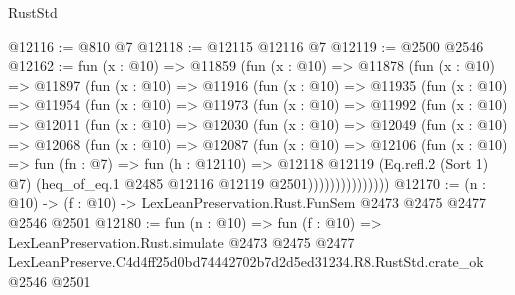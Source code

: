 \begin{lexlean}{RustStd}
\begin{coremodule}
@12116 := @810 @7
@12118 := @12115 @12116 @7
@12119 := @2500 @2546
@12162 := fun (x : @10) =>
  @11859
    (fun (x : @10) =>
    @11878
      (fun (x : @10) =>
      @11897
        (fun (x : @10) =>
        @11916
          (fun (x : @10) =>
          @11935
            (fun (x : @10) =>
            @11954
              (fun (x : @10) =>
              @11973
                (fun (x : @10) =>
                @11992
                  (fun (x : @10) =>
                  @12011
                    (fun (x : @10) =>
                    @12030
                      (fun (x : @10) =>
                      @12049
                        (fun (x : @10) =>
                        @12068
                          (fun (x : @10) =>
                          @12087
                            (fun (x : @10) =>
                            @12106
                              (fun (x : @10) =>
                              fun (fn : @7) =>
                              fun (h : @12110) =>
                              @12118
                                @12119
                                (Eq.refl.{2} (Sort 1) @7)
                                (heq_of_eq.{1} @2485 @12116 @12119 @2501)))))))))))))))
@12170 := (n : @10) -> (f : @10) -> LexLeanPreservation.Rust.FunSem @2473 @2475 @2477 @2546 @2501
@12180 := fun (n : @10) =>
  fun (f : @10) =>
  LexLeanPreservation.Rust.simulate
    @2473
    @2475
    @2477
    LexLeanPreserve.C4d4ff25d0bd74442702b7d2d5ed31234.R8.RustStd.crate_ok
    @2546
    @2501
\end{coremodule}
\end{lexlean}
